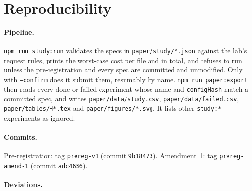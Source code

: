 \documentclass[11pt]{article}
\begin{document}



\appendix
\section{Reproducibility}\label{app:repro}
\paragraph{Pipeline.} \texttt{npm run study:run} validates the specs in \texttt{paper/study/*.json} against the lab's request rules, prints the worst-case cost per file and in total, and refuses to run unless the pre-registration and every spec are committed and unmodified. Only with \texttt{--confirm} does it submit them, resumably by name. \texttt{npm run paper:export} then reads every done or failed experiment whose name and \texttt{configHash} match a committed spec, and writes \texttt{paper/data/study.csv}, \texttt{paper/data/failed.csv}, \texttt{paper/tables/H*.tex} and \texttt{paper/figures/*.svg}. It lists other \texttt{study:*} experiments as ignored.

\paragraph{Commits.} Pre-registration: tag \texttt{prereg-v1} (commit \texttt{9b18473}). Amendment~1: tag \texttt{prereg-amend-1} (commit \texttt{adc4636}).

\paragraph{Deviations.}
\end{document}
